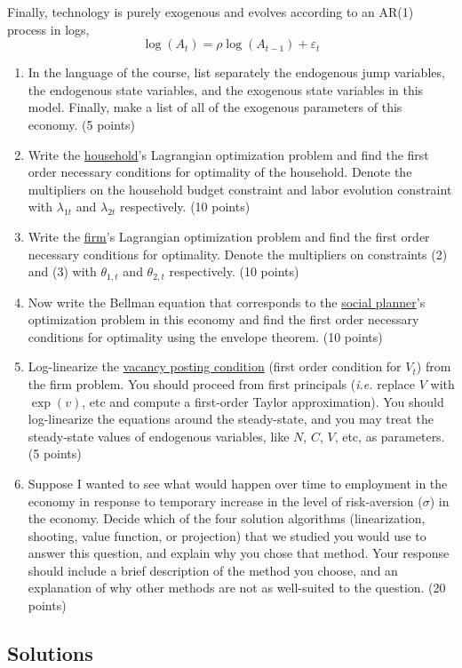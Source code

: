 \documentclass[10pt]{article}
\newcommand{\ie}{\emph{i.e.} }
\theoremstyle{plain}
\theoremstyle{definition}
\begin{document}
Finally, technology is purely exogenous and evolves according to an AR(1) process in logs,
\[
\log(A_t) = \rho \log(A_{t-1}) + \varepsilon_t
\]



\begin{enumerate}
	\item In the language of the course, list separately the endogenous jump variables, the endogenous state variables, and the exogenous state variables in this model. Finally, make a list of all of the exogenous parameters of this economy. (5 points)
	\item Write the \underline{household}'s Lagrangian optimization problem and find the first order necessary conditions for optimality of the household. Denote the multipliers on the household budget constraint and labor evolution constraint with $\lambda_{1t}$ and $\lambda_{2t}$ respectively. (10 points)
	\item Write the \underline{firm}'s Lagrangian optimization problem and find the first order necessary conditions for optimality. Denote the multipliers on constraints (2) and (3) with $\theta_{1,t}$ and $\theta_{2,t}$ respectively. (10 points)
	\item Now write the Bellman equation that corresponds to the \underline{social planner}'s optimization problem in this economy and find the first order necessary conditions for optimality using the envelope theorem. (10 points)
	\item Log-linearize the \underline{vacancy posting condition} (first order condition for $V_t$) from the firm problem. You should proceed from first principals (\ie replace $V$ with $\exp(v)$, etc and compute a first-order Taylor approximation). You should log-linearize the equations around the steady-state, and you may treat the steady-state values of endogenous variables, like $N$, $C$, $V$, etc, as parameters. (5 points)
	\item Suppose I wanted to see what would happen over time to employment in the economy in response to temporary increase in the level of risk-aversion ($\sigma$) in the economy. Decide which of the four solution algorithms (linearization, shooting, value function, or projection) that we studied you would use to answer this question, and explain why you chose that method. Your response should include a brief description of the method you choose, and an explanation of why other methods are not as well-suited to the question. (20 points)
\end{enumerate}
\subsection{Solutions}
\end{document}
